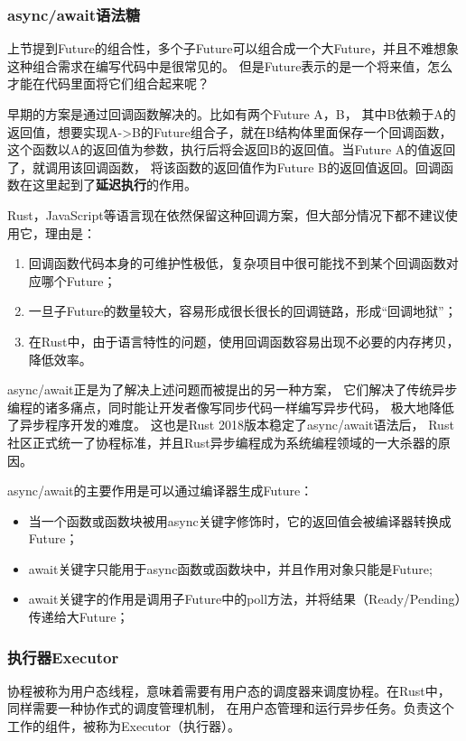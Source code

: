 \documentclass[supercite]{HustGraduPaper}
\theoremstyle{definition}
\begin{document}
\subsubsection{async/await语法糖}
上节提到Future的组合性，多个子Future可以组合成一个大Future，并且不难想象这种组合需求在编写代码中是很常见的。
但是Future表示的是一个将来值，怎么才能在代码里面将它们组合起来呢？\par

早期的方案是通过回调函数解决的。比如有两个Future A，B，
其中B依赖于A的返回值，想要实现A->B的Future组合子，就在B结构体里面保存一个回调函数，
这个函数以A的返回值为参数，执行后将会返回B的返回值。当Future A的值返回了，就调用该回调函数，
将该函数的返回值作为Future B的返回值返回。回调函数在这里起到了\textbf{延迟执行}的作用。\par

Rust，JavaScript等语言现在依然保留这种回调方案，但大部分情况下都不建议使用它，理由是：
\begin{enumerate}
  \item 回调函数代码本身的可维护性极低，复杂项目中很可能找不到某个回调函数对应哪个Future；
  \item 一旦子Future的数量较大，容易形成很长很长的回调链路，形成“回调地狱”；
  \item 在Rust中，由于语言特性的问题，使用回调函数容易出现不必要的内存拷贝，降低效率。
\end{enumerate}

async/await正是为了解决上述问题而被提出的另一种方案，
它们解决了传统异步编程的诸多痛点，同时能让开发者像写同步代码一样编写异步代码，
极大地降低了异步程序开发的难度。
这也是Rust 2018版本稳定了async/await语法后，
Rust社区正式统一了协程标准，并且Rust异步编程成为系统编程领域的一大杀器的原因。

async/await的主要作用是可以通过编译器生成Future：
\begin{itemize}
  \item 当一个函数或函数块被用async关键字修饰时，它的返回值会被编译器转换成Future；
  \item await关键字只能用于async函数或函数块中，并且作用对象只能是Future;
  \item await关键字的作用是调用子Future中的poll方法，并将结果（Ready/Pending）传递给大Future；
\end{itemize}

\subsubsection{执行器Executor}
协程被称为用户态线程，意味着需要有用户态的调度器来调度协程。在Rust中，同样需要一种协作式的调度管理机制，
在用户态管理和运行异步任务。负责这个工作的组件，被称为Executor（执行器）。\par
\end{document}
